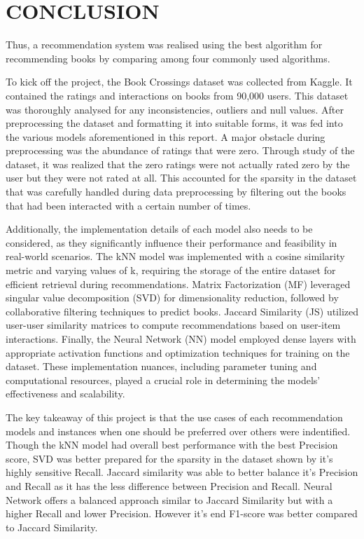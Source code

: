 \chapter{CONCLUSION}

Thus, a recommendation system was realised using the best algorithm for recommending books by comparing among four commonly used algorithms.

To kick off the project, the Book Crossings dataset was collected from Kaggle. It contained the ratings and interactions on books from 90,000 users. This dataset was thoroughly analysed for any inconsistencies, outliers and null values. After preprocessing the dataset and formatting it into suitable forms, it was fed into the various models aforementioned in this report. A major obstacle during preprocessing was the abundance of ratings that were zero. Through study of the dataset, it was realized that the zero ratings were not actually rated zero by the user but they were not rated at all. This accounted for the sparsity in the dataset that was carefully handled during data preprocessing by filtering out the books that had been interacted with a certain number of times.

Additionally, the implementation details of each model also needs to be considered, as they significantly influence their performance and feasibility in real-world scenarios. The kNN model was implemented with a cosine similarity metric and varying values of k, requiring the storage of the entire dataset for efficient retrieval during recommendations. Matrix Factorization (MF) leveraged singular value decomposition (SVD) for dimensionality reduction, followed by collaborative filtering techniques to predict books. Jaccard Similarity (JS) utilized user-user similarity matrices to compute recommendations based on user-item interactions. Finally, the Neural Network (NN) model employed dense layers with appropriate activation functions and optimization techniques for training on the dataset. These implementation nuances, including parameter tuning and computational resources, played a crucial role in determining the models' effectiveness and scalability.

The key takeaway of this project is that the use cases of each recommendation models and instances when one should be preferred over others were indentified. Though the kNN model had overall best performance with the best Precision score, SVD was better prepared for the sparsity in the dataset shown by it's highly sensitive Recall. Jaccard similarity was able to better balance it's Precision and Recall as it has the less difference between Precision and Recall. Neural Network offers a balanced approach similar to Jaccard Similarity but with a higher Recall and lower Precision. However it's end F1-score was better compared to Jaccard Similarity.

